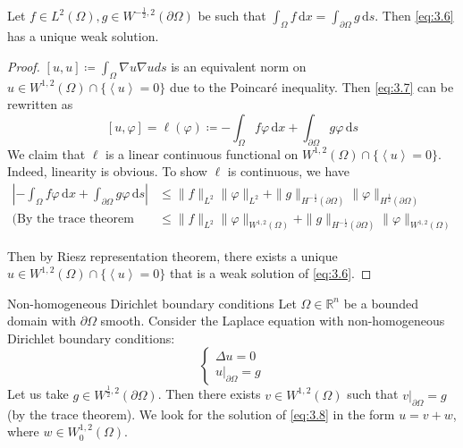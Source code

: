 \documentclass{report}
\begin{document}
\begin{theorem}{}{}
    Let \(f \in L^{2}(\Omega), g \in W^{-\frac{1}{2}, 2}(\partial \Omega)\) be such that \(\int_{\Omega} f \,\mathrm{d}x = \int_{\partial\Omega} g \,\mathrm{d}s\). Then \ref{eq:3.6} has a unique weak solution.  
\end{theorem}

\begin{proof}
    \([u, u] \coloneqq \int_{\Omega} \nabla u \nabla u ds\) is an equivalent norm on \(u \in W^{1, 2}(\Omega) \cap \{\left\langle u \right\rangle = 0\}\) due to the Poincaré inequality. Then \ref{eq:3.7} can be rewritten as
    \[
        [u, \varphi] = \ell(\varphi) \coloneqq - \int_{\Omega} f\varphi\,\mathrm{d}x + \int_{\partial\Omega} g\varphi\,\mathrm{d}s
    \]
    We claim that \(\ell\) is a linear continuous functional on \(W^{1, 2}(\Omega) \cap \{\left\langle u \right\rangle = 0\}\). Indeed, linearity is obvious. To show \(\ell\) is  continuous, we have
    \begin{align*}
        \left\vert - \int_{\Omega} f\varphi\,\mathrm{d}x + \int_{\partial\Omega} g\varphi\,\mathrm{d}s \right\vert &\leq \|f\|_{L^{2}} \|\varphi\|_{L^{2}} + \|g\|_{H^{-\frac{1}{2}}(\partial \Omega)}\|\varphi\|_{H^{\frac{1}{2}}(\partial \Omega)} \\
        \text{(By the trace theorem and Poincaré's inequality)} &\leq \|f\|_{L^{2}} \|\varphi\|_{W^{1, 2}(\Omega)} + \|g\|_{H^{-\frac{1}{2}}(\partial \Omega)}\|\varphi\|_{W^{1, 2}(\Omega)}  
    \end{align*}

Then by Riesz representation theorem, there exists a unique \(u \in W^{1, 2}(\Omega) \cap \{\left\langle u \right\rangle = 0\}\) that is a weak solution of \ref{eq:3.6}.
\end{proof}

\begin{example}{Non-homogeneous Dirichlet boundary conditions}{}
    Let \(\Omega \in \mathbb{R}^{n}\) be a bounded domain with \(\partial \Omega\) smooth. Consider the Laplace equation with non-homogeneous Dirichlet boundary conditions:
    \begin{equation}\label{eq:3.8}
        \begin{cases}
            \Delta u = 0 \\
            \left. u \right|_{\partial \Omega} = g
        \end{cases}
    \end{equation}
    Let us take \(g \in W^{\frac{1}{2}, 2}(\partial \Omega)\). Then there exists \(v \in W^{1, 2}(\Omega)\) such that \(\left. v \right|_{\partial \Omega} = g\) (by the trace theorem). We look for the solution of \ref{eq:3.8} in the form \(u = v + w\), where \(w \in W^{1, 2}_{0}(\Omega)\).
\end{example}
\end{document}
